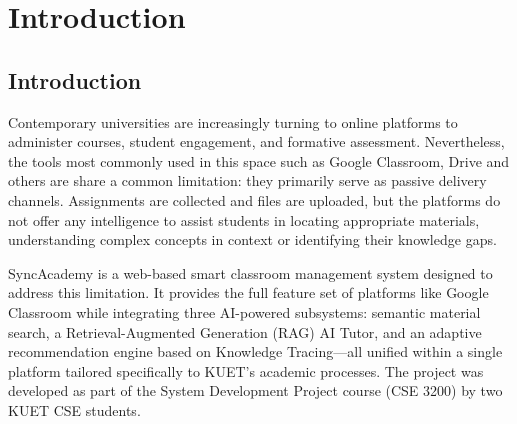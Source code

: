 \documentclass[12pt,a4paper]{report}
\begin{document}
\tableofcontents\newpage

\listoftables\newpage

\listoffigures\newpage

\setcounter{page}{1}

\chapter{Introduction}

\section{Introduction}

Contemporary universities are increasingly turning to online platforms to administer courses, student engagement, and formative assessment. Nevertheless, the tools most commonly used in this space such as Google Classroom, Drive and others are share a common limitation: they primarily serve as passive delivery channels. Assignments are collected and files are uploaded, but the platforms do not offer any intelligence to assist students in locating appropriate materials, understanding complex concepts in context or identifying their knowledge gaps.

SyncAcademy is a web-based smart classroom management system designed to address this limitation. It provides the full feature set of platforms like Google Classroom while integrating three AI-powered subsystems: semantic material search, a Retrieval-Augmented Generation (RAG) AI Tutor, and an adaptive recommendation engine based on Knowledge Tracing—all unified within a single platform tailored specifically to KUET’s academic processes. The project was developed as part of the System Development Project course (CSE 3200) by two KUET CSE students.
\end{document}
